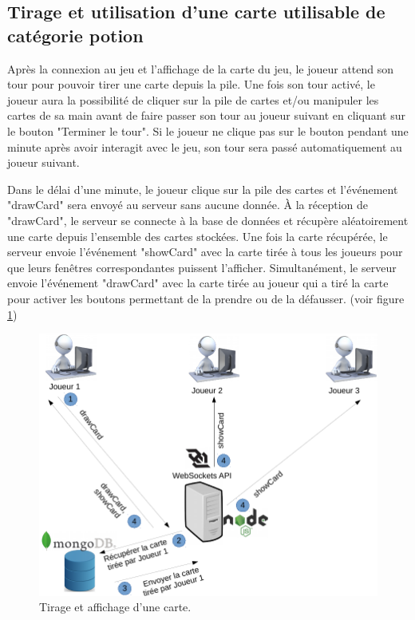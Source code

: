 \documentclass[12pt]{report}
\begin{document}
			\subsection{Tirage et utilisation d'une carte utilisable de catégorie potion}
			Après la connexion au jeu et l'affichage de la carte du jeu, le joueur attend son tour pour pouvoir tirer une carte depuis la pile. Une fois son tour activé, le joueur aura la possibilité de cliquer sur la pile de cartes et/ou manipuler les cartes de sa main avant de faire passer son tour au joueur suivant en cliquant sur le bouton "Terminer le tour". Si le joueur ne clique pas sur le bouton pendant une minute après avoir interagit avec le jeu, son tour sera passé automatiquement au joueur suivant.

			Dans le délai d'une minute, le joueur clique sur la pile des cartes et l'événement "drawCard" sera envoyé au serveur sans aucune donnée. À la réception de "drawCard", le serveur se connecte à la base de données et récupère aléatoirement une carte depuis l'ensemble des cartes stockées. Une fois la carte récupérée, le serveur envoie l'événement "showCard" avec la carte tirée à tous les joueurs pour que leurs fenêtres correspondantes puissent l'afficher. Simultanément, le serveur envoie l'événement "drawCard" avec la carte tirée au joueur qui a tiré la carte pour activer les boutons permettant de la prendre ou de la défausser. (voir figure \ref{fig:useCase21})

			\begin{figure}[h!]
		  	\centering
		    \includegraphics[scale=0.5]{images/useCase21.png}
		    \caption{Tirage et affichage d'une carte.}
				\label{fig:useCase21}
		  \end{figure}
\end{document}
